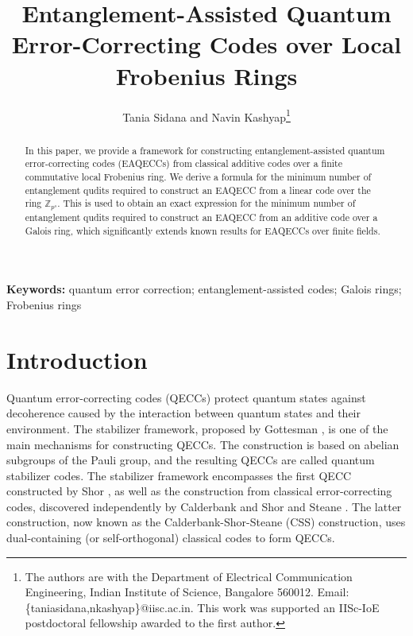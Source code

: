 \documentclass{article}
\theoremstyle{remark}
\theoremstyle{definition}
\numberwithin{equation}{section}
\begin{document}
 
 
\title{\bf {Entanglement-Assisted Quantum Error-Correcting Codes over Local Frobenius Rings}}
 
\author{Tania Sidana and Navin Kashyap\thanks{The authors are with the Department of Electrical Communication Engineering, Indian Institute of Science, Bangalore 560012. Email: \{taniasidana,nkashyap\}@iisc.ac.in. This work was supported an IISc-IoE postdoctoral fellowship awarded to the first author.}}

\date{}
 
\maketitle 

 \begin{abstract} In this paper, we provide a framework for constructing entanglement-assisted quantum error-correcting codes (EAQECCs) from classical additive codes over a finite commutative local Frobenius ring. We derive a formula for the minimum number of entanglement qudits required to construct an EAQECC from a linear code over the ring $\mathbb{Z}_{p^s}$. This is used to obtain an exact expression for the minimum number of entanglement qudits required to construct an EAQECC from an additive code over a Galois ring, which significantly extends known results for EAQECCs over finite fields. \end{abstract}

 {\bf Keywords:} { quantum error correction; entanglement-assisted codes; Galois rings; Frobenius rings}

 \section{Introduction}
Quantum error-correcting codes (QECCs) protect quantum states against decoherence caused by the interaction between quantum states and their environment. The stabilizer framework, proposed by Gottesman \cite{gottesman}, is one of the main mechanisms for constructing QECCs. The construction is based on abelian subgroups of the Pauli group, and the resulting QECCs are called quantum stabilizer codes. The stabilizer framework encompasses the first QECC constructed by Shor \cite{shor}, as well as the construction from classical error-correcting codes, discovered independently by Calderbank and Shor \cite{calderbank} and Steane \cite{steane}. The latter construction, now known as the Calderbank-Shor-Steane (CSS) construction, uses dual-containing (or self-orthogonal) classical codes to form QECCs. 
\end{document}
